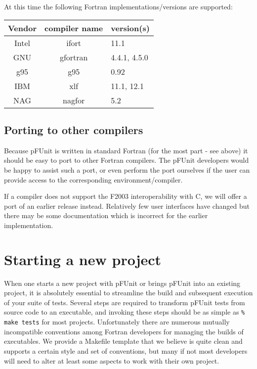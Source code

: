 \documentclass[10pt]{article}
\newcommand{\pfunit}{{\sc pFUnit }}
\begin{document}
At this time the following Fortran implementations/versions are
supported:\\

\begin{tabular}{||c|c|l||}
\hline
Vendor & compiler name & version(s) \\
\hline
Intel & ifort & 11.1 \\
GNU   & gfortran & 4.4.1, 4.5.0 \\
g95   & g95   & 0.92 \\
IBM & xlf & 11.1, 12.1 \\
NAG & nagfor & 5.2 \\
\hline
\end{tabular}

\subsection{Porting to other compilers}
Because \pfunit is written in standard Fortran (for the most part -
see above) it should be easy to port to other Fortran compilers.  The
\pfunit developers would be happy to assist such a port, or even
perform the port ourselves if the user can provide access to the
corresponding environment/compiler.

If a compiler does not support the F2003 interoperability with C, we
will offer a port of an earlier release instead.  Relatively few user
interfaces have changed but there may be some documentation which is
incorrect for the earlier implementation.

\newpage

\section{Starting a new project}

When one starts a new project with \pfunit or brings \pfunit into an
existing project, it is absolutely essential to streamline the build
and subsequent execution of your suite of tests.  Several steps are
required to transform \pfunit tests from source code to an executable,
and invoking these steps should be as simple as \verb+% make tests+
for most projects.  Unfortunately there are numerous mutually
incompatible conventions among Fortran developers for managing the
builds of executables.  We provide a Makefile template that we believe
is quite clean and supports a certain style and set of conventions,
but many if not most developers will need to alter at least some
aspects to work with their own project.
\end{document}
